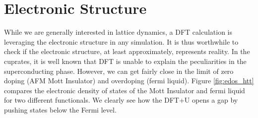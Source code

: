 
\section{Electronic Structure}
While we are generally interested in lattice dynamics, a DFT calculation is leveraging the electronic structure in any simulation. It is thus worthwhile to check if the electronic structure, at least approximately, represents reality. In the cuprates, it is well known that DFT is unable to explain the peculiarities in the superconducting phase. However, we can get fairly close in the limit of zero doping (AFM Mott Insulator) and overdoping (fermi liquid). Figure \ref{fig:edos_htt} compares the electronic density of states of the Mott Insulator and fermi liquid for two different functionals. We clearly see how the DFT+U opens a gap by pushing states below the Fermi level.

